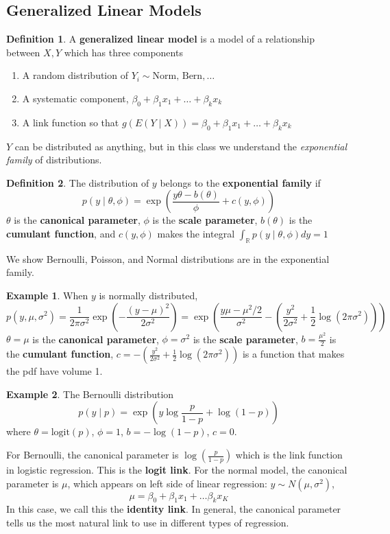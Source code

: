 \documentclass[12pt, a4paper]{article}
\theoremstyle{definition}
\newtheorem{definition}{Definition}
\newtheorem{example}{Example}
\newcommand{\R}{\mathbb{R}}                           %
\newcommand{\f}{\frac}
\newcommand{\BB}[1]{\left(#1\right)}
\begin{document}
	\subsection{Generalized Linear Models}	
	
	\begin{definition}
		A {\bf generalized linear model} is a model of a relationship between $X,Y$ which has three components
		\begin{enumerate}
			\item A random distribution of $Y_i \sim \text{Norm, Bern}, \ldots$
			\item A systematic component, $\beta_0 + \beta_1 x_1 + \ldots + \beta_k x_k$
			\item A link function so that $g(E(Y\mid X)) =\beta_0 + \beta_1 x_1 + \ldots + \beta_k x_k$
		\end{enumerate}
	\end{definition}

	$Y$ can be distributed as anything, but in this class we understand the \textit{exponential family} of distributions.
	
	\begin{definition}
		The distribution of $y$ belongs to the {\bf exponential family} if 
		$$
			p(y\mid \theta, \phi) = \exp\BB{\f{y\theta - b(\theta)}{\phi} + c(y, \phi)}
		$$ 
		$\theta$ is the {\bf canonical parameter}, $\phi$ is the {\bf scale parameter}, $b(\theta)$ is the {\bf cumulant function}, and $c(y, \phi)$ makes the integral 
		$\int_\R p(y \mid \theta, \phi ) dy = 1$
	\end{definition}

	We show Bernoulli, Poisson, and Normal distributions are in the exponential family.
	
	
	\begin{example}
		When $y$ is normally distributed, 
		$$
			p(y,\mu, \sigma^2) = \f1{2\pi\sigma^2}\exp\BB{-\f{(y-\mu)^2}{2\sigma^2}}
			=\exp\BB{\f{y\mu-\mu^2/2}{\sigma^2} - \BB{\f{y^2}{2\sigma^2} + \f12\log(2\pi\sigma^2)} }
		$$
		$\theta = \mu$ is the {\bf canonical parameter}, $\phi = \sigma^2$ is the  {\bf scale parameter}, $b = \f{\mu^2}{2}$ is the {\bf cumulant function}, $c =  - \BB{\f{y^2}{2\sigma^2} + \f12\log(2\pi\sigma^2)}$ is a function that makes the pdf have volume 1.
	\end{example}
	\begin{example}
		The Bernoulli distribution 
		$$
			p(y \mid p) = \exp\BB{y \log \f{p}{1-p} + \log(1-p)}
		$$
		where $\theta = \text{logit}(p)$, $\phi = 1$, $b = - \log(1-p)$, $c = 0$.
	\end{example}
	For Bernoulli, the canonical parameter is $\log(\f{p}{1-p})$ which is the link function in logistic regression. This is the {\bf logit link}. For the normal model, the canonical parameter is $\mu$, which appears on left side of linear regression: $y \sim N(\mu, \sigma^2)$,
	$$
		\mu = \beta_0 + \beta_1x_1 + \ldots \beta_kx_K
	$$
	In this case, we call this the {\bf identity link}. In general, the canonical parameter tells us the most natural link to use in different types of regression.\\
	
\end{document}
